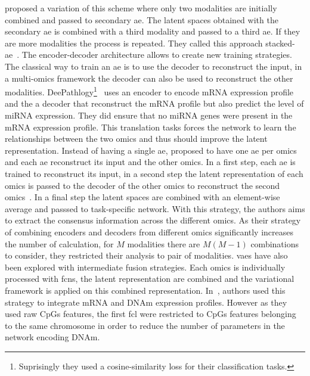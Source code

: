\documentclass[../main.tex]{subfiles}
\begin{document}
	    \citeauthor{Wu2022StackedAB} proposed a variation of this scheme where only two modalities are initially combined and passed to secondary \gls{ae}.
	    The latent spaces obtained with the secondary \gls{ae} is combined with a third modality and passed to a third \gls{ae}.
	    If they are more modalities the process is repeated.
	    They called this approach stacked-\gls{ae}~\cite{Wu2022StackedAB}.
	    The encoder-decoder architecture allows to create new training strategies.
	    The classical way to train an \gls{ae} is to use the decoder to reconstruct the input, in a multi-omics framework the decoder can also be used to reconstruct the other modalities.
	    DeePathlogy\footnote{Suprisingly they used a cosine-similarity loss for their classification tasks.}~\cite{Azarkhalili2019} uses an encoder to encode mRNA expression profile and the a decoder that reconstruct the mRNA profile but also predict the level of miRNA expression.
	    They did ensure that no miRNA genes were present in the mRNA expression profile.
	    This translation tasks forces the network to learn the relationships between the two omics and thus should improve the latent representation.
	    Instead of having a single \gls{ae}, \citeauthor{CrossAE} proposed to have one \gls{ae} per omics and each \gls{ae} reconstruct its input and the other omics.
	    In a first step, each \gls{ae} is trained to reconstruct its input, in a second step the latent representation of each omics is passed to the decoder of the other omics to reconstruct the second omics~\cite{CrossAE}.
	    In a final step the latent spaces are combined with an element-wise average and passsed to task-specific network.
	    With this strategy, the authors aims to extract the consensus information across the different omics.
	    As their strategy of combining encoders and decoders from different omics significantly increases the number of calculation, for \(M\) modalities there are \(M(M-1)\) combinations to consider, they restricted their analysis to pair of modalities.
	    \Glspl{vae} have also been explored with intermediate fusion strategies.
	    Each omics is individually processed with \glspl{fcn}, the latent representation are combined and the variational framework is applied on this combined representation.
	    In~\cite{Zhang2019}, authors used this strategy to integrate mRNA and DNAm expression profiles.
	    However as they used raw CpGs features, the first \gls{fcl} were restricted to CpGs features belonging to the same chromosome in order to reduce the number of parameters in the network encoding DNAm.
\end{document}
